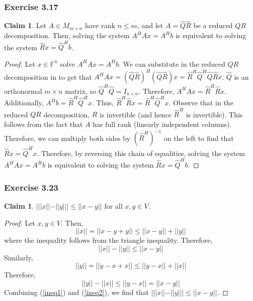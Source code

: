 \documentclass[letterpaper,12pt]{article}
\theoremstyle{definition}
\newtheorem{claim}[theorem]{Claim}
\begin{document}
\subsubsection*{Exercise 3.17}
\begin{claim}
	Let $A \in M_{m\times n}$ have rank $n \leq m$, and let $A = \hat{Q}\hat{R}$ be a reduced $QR$ decomposition. Then, solving the system $A^HAx = A^Hb$ is equivalent to solving the system $\hat{R}x = \hat{Q}^Hb$.
\end{claim}
\begin{proof}
	Let $x \in \mathbb{F}^n$ solve $A^HAx = A^Hb$. We can substitute in the reduced $QR$ decomposition in to get that $A^HAx = (\hat{Q}\hat{R})^H (\hat{Q}\hat{R}) x = \hat{R}^H\hat{Q}^H\hat{Q}\hat{R}x$. $\hat{Q}$ is an orthonormal $m \times n$ matrix, so $\hat{Q}^H\hat{Q} = I_{n\times n}$. Therefore, $A^HAx = \hat{R}^H \hat{R}x$. Additionally, $A^Hb = \hat{R}^H\hat{Q}^Hx$. Thus, $\hat{R}^H \hat{R} x =  \hat{R}^H\hat{Q}^Hx$. Observe that in the reduced $QR$ decomposition, $\hat{R}$ is invertible (and hence $\hat{R}^H$ is invertible).  This follows from the fact that $A$ has full rank (linearly independent columns). Therefore, we can multiply both sides by $\left(\hat{R}^H\right)^{-1}$ on the left to find that $\hat{R} x =  \hat{Q}^Hx$. Therefore, by reversing this chain of equalities, solving the system $A^HAx = A^Hb$ is equivalent to solving the system $\hat{R}x = \hat{Q}^Hb$.
\end{proof}

\subsubsection*{Exercise 3.23}
\begin{claim}
$| ||x|| - ||y|| | \leq ||x - y||$ for all $x, y \in V$.
\end{claim}
\begin{proof}
Let $x, y \in V$. Then,
\begin{equation}
 ||x|| = ||x - y + y|| \leq ||x - y|| + ||y||
\end{equation}
where the inequality follows from the triangle inequality. Therefore,
\begin{equation}\label{ineq1}
||x||  - ||y|| \leq ||x - y||
\end{equation}
Similarly,
\begin{equation}
||y|| = ||y - x + x|| \leq ||y - x|| + ||x||
\end{equation}
Therefore, 
\begin{equation}\label{ineq2}
||y|| - ||x|| \leq ||y - x|| = || x - y ||
\end{equation}
Combining (\ref{ineq1}) and (\ref{ineq2}), we find that $| ||x|| - ||y|| | \leq ||x - y||$.
\end{proof}
\end{document}
